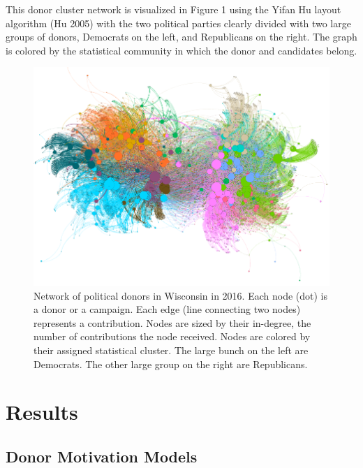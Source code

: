 \documentclass[12pt,]{article}
\begin{document}
This donor cluster network is visualized in Figure 1 using the Yifan Hu
layout algorithm (Hu 2005) with the two political parties clearly
divided with two large groups of donors, Democrats on the left, and
Republicans on the right. The graph is colored by the statistical
community in which the donor and candidates belong.

\begin{figure}
\centering
\includegraphics{../tables_and_figures/fig_1_white.png}
\caption{Network of political donors in Wisconsin in 2016. Each node
(dot) is a donor or a campaign. Each edge (line connecting two nodes)
represents a contribution. Nodes are sized by their in-degree, the
number of contributions the node received. Nodes are colored by their
assigned statistical cluster. The large bunch on the left are Democrats.
The other large group on the right are Republicans.}
\end{figure}

\hypertarget{results}{%
\section{Results}\label{results}}

\hypertarget{donor-motivation-models}{%
\subsection{Donor Motivation Models}\label{donor-motivation-models}}
\end{document}
